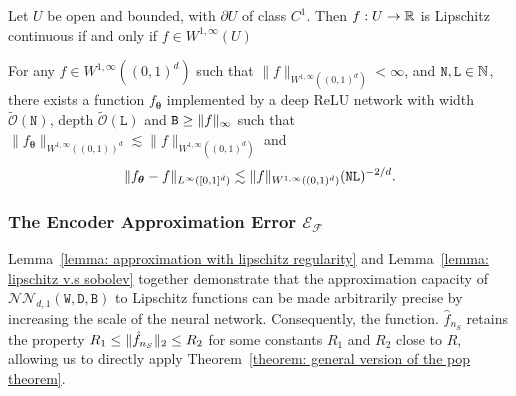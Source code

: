 \begin{lemma}
    \label{lemma: lipschitz v.s sobolev}
    Let $U$ be open and bounded, with $\partial U$ of class $C^1$. Then $f : U \to \mathbb{R}$ is Lipschitz continuous if and only if $f \in W^{1, \infty}(U)$
\end{lemma}
\begin{lemma}
    \label{lemma: approximation with lipschitz regularity}
    For any $f \in W^{1, \infty}((0, 1)^d)$ such that  $\|f\|_{W^{1, \infty}((0,1)^d)} < \infty$, and $\mathtt{N}, \mathtt{L} \in \mathbb{N}$, there exists a function $f_{\bm{\theta}}$ implemented by a deep ReLU network with width $\widetilde{\mathcal{O}}(\mathtt{N})$, depth $\widetilde{\mathcal{O}}(\mathtt{L})$ and $\mathtt{B} \geq \Vert{f}\Vert_\infty$ such that $\|f_{\bm{\theta}}\|_{W^{1, \infty}((0, 1))^d} \lesssim \|f\|_{W^{1, \infty}((0,1)^d)}$ and
    \begin{align*}
        \Vert{f_{\bm{\theta}} - f}\Vert_{L^\infty([0,1]^d)} \lesssim \Vert{f}\Vert_{W^{1, \infty}((0,1)^d)}(\mathtt{N}\mathtt{L})^{-2/d}.
    \end{align*}
\end{lemma}
\subsubsection{The Encoder Approximation Error \texorpdfstring{$\mathcal{E}_{\mathcal{F}}$}{EF}}\label{subsection: encoder approximation error}
Lemma~\ref{lemma: approximation with lipschitz regularity} and Lemma~\ref{lemma: lipschitz v.s sobolev} together demonstrate that the approximation capacity of $\mathcal{NN}_{d, 1}(\mathtt{W},\mathtt{D}, \mathtt{B})$ to Lipschitz functions can be made arbitrarily precise by increasing the scale of the neural network. Consequently, the function. $\hat{f}_{n_S}$ retains the property $R_1 \leq \Vert{\hat{f}_{n_S}}\Vert_2 \leq R_2$  for some constants $R_1$ and $R_2$ close to  $R$, allowing us to directly apply Theorem~\ref{theorem: general version of the pop theorem}.

